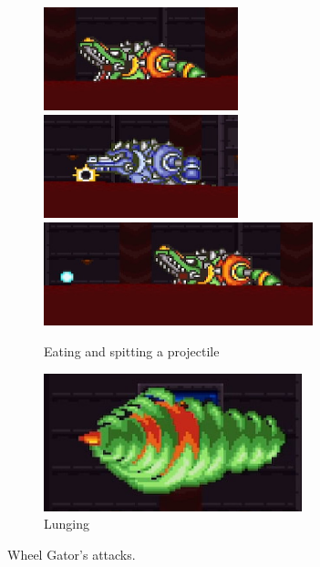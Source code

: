 \begin{figure}
	\ContinuedFloat
	\centering
	\begin{subfigure}{\linewidth}
		\centering
		\includegraphics[height=3cm]{figures/X2/Wheel_gator/Gator_mouth.png}
		\includegraphics[height=3cm]{figures/X2/Wheel_gator/Gator_absorb.png}
		\includegraphics[height=3cm]{figures/X2/Wheel_gator/Gator_spit.png}
		\caption{Eating and spitting a projectile}
	\end{subfigure}
	\begin{subfigure}{0.8\linewidth}
		\centering
		\includegraphics[height=4cm]{figures/X2/Wheel_gator/Gator_DM.png}
		\caption{Lunging}
	\end{subfigure}
	\caption{Wheel Gator's attacks.}	
\end{figure}

